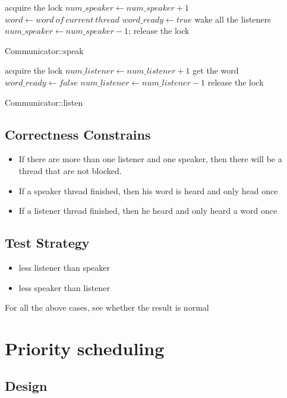 \documentclass[a4paper,10pt]{article}
\begin{document}
\begin{algorithm}

acquire the lock\;
$num\_speaker \gets num\_speaker+1$\;
$word \gets word ~of~ current~ thread$\;
$word\_ready \gets true$\;
wake all the listeners\;
$num\_speaker\gets num\_speaker-1$;\;
release the lock\;
\caption{Communicator::speak}
\end{algorithm}

\begin{algorithm}

acquire the lock\;
$num\_listener\gets num\_listener+1$\;
get the word\;
$ word\_ready\gets false$\;
$ num\_listener\gets num\_listener-1$\;
release the lock
\caption{Communicator::listen}
\end{algorithm}

\subsection{Correctness Constrains}
\begin{itemize}
\item If there are more than one listener and one speaker, then there will be a thread that are not blocked.
\item If a speaker thread finished, then his word is heard and only head once
\item If a listener thread finished, then he heard and only heard a word once
\end{itemize}
\subsection {Test Strategy}
\begin{itemize}
\item less listener than speaker
\item less speaker than listener
\end{itemize}
For all the above cases, see whether the result is normal
\section{Priority scheduling}


\subsection{Design}
\end{document}

